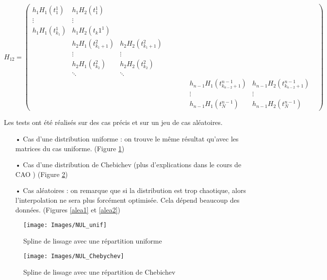 \documentclass[a4paper,12pt]{article} %
\begin{document}
                
                $$H_{12}=\begin{pmatrix} h_1H_1(t_1^1)&h_1H_2(t_1^1)& & & & & & & &  \\ \vdots&\vdots& & & & & & &  \\ h_1H_1(t_{k_1}^1)&h_1H_2(t_k1^1)& & & & & & & \\ &h_2H_1(t_{{k_1}+1}^2)&h_2H_2(t_{{k_1}+1}^2)& & & & & &   \\ &\vdots&\vdots& & & & & &  \\ &h_2H_1(t_{k_2}^2)&h_2H_2(t_{k_2}^2)& & & & & & \\ &\ddots&\ddots & & & & & & & \\ & & & & & & &h_{n-1}H_1(t_{{k_{n-2}}+1}^{n-1}) &h_{n-1}H_2(t_{{k_{n-2}}+1}^{n-1})\\ & & & & & & &\vdots &\vdots\\ & & & & & & &h_{n-1}H_1(t_N^{n-1}) &h_{n-1}H_2(t_N^{n-1}) \end{pmatrix}$$
                


    			Les tests ont été réalisés sur des cas précis et sur un jeu de cas aléatoires.
    
                \begin{itemize}
                \item[•] Cas d'une distribution uniforme : on trouve le même résultat qu'avec les matrices du cas uniforme. (Figure \ref{unif})
                \item[•] Cas d'une distribution de Chebichev (plus d'explications dans le cours de CAO \cite{CAO_lissage}) (Figure \ref{chebi})
                \item[•] Cas aléatoires : on remarque que si la distribution est trop chaotique, alors l'interpolation ne sera plus forcément optimisée. Cela dépend beaucoup des données. (Figures \ref{alea1} et \ref{alea2})
                \end{itemize}
                
                \begin{figure}[H]
                \begin{center}
                \texttt{[image: Images/NUL\_unif]} 
                \end{center}
                \caption{Spline de lissage avec une répartition uniforme}
                \label{unif}
                \end{figure}
                
                \begin{figure}[H]
                \begin{center}
                \texttt{[image: Images/NUL\_Chebychev]} 
                \end{center}
                \caption{Spline de lissage avec une répartition de Chebichev}
                \label{chebi}
                \end{figure}
                
\end{document}
